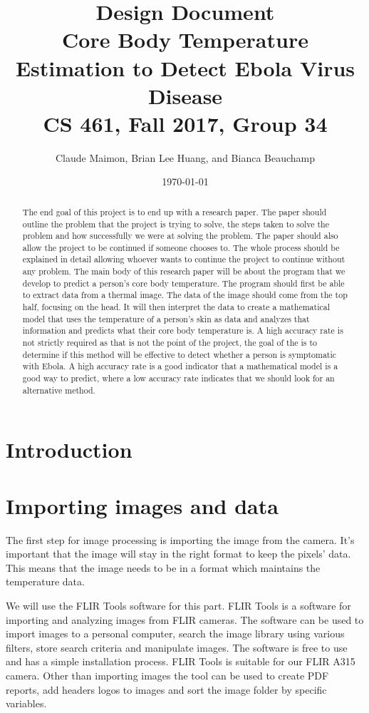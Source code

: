 \documentclass[onecolumn, draftclsnofoot,10pt, compsoc]{IEEEtran}
\title{%
  Design Document \\
  \vspace{0.4cm}
  \large Core Body Temperature Estimation to Detect Ebola Virus Disease \\
  \vspace{0.4cm}
  \large CS 461, Fall 2017, Group 34\\
    }
\author{Claude Maimon, Brian Lee Huang, and Bianca Beauchamp}
\date{\today}
\begin{document}
\maketitle

\begin{abstract}
	The end goal of this project is to end up with a research paper. The paper should outline the problem that the project is trying to solve, the steps taken to solve the problem and how successfully we were
	at solving the problem. The paper should also allow the project to be continued if someone chooses to. The whole process should be explained in detail allowing whoever wants to continue the
	project to continue without any problem. The main body of this research paper will be about the program that we develop to predict a person's core body temperature. The program should first be able to
	extract data from a thermal image. The data of the image should come from the top half, focusing on the head. It will then interpret the data to create a mathematical model that uses the temperature of a 
	person's skin as data and analyzes that information and predicts what their core body temperature is. A high accuracy rate is not strictly required as that is not the point of the project, 
	the goal of the is to determine if this method will be effective to detect whether a person is symptomatic with Ebola. A high accuracy rate is a good indicator that a mathematical model
	is a good way to predict, where a low accuracy rate indicates that we should look for an alternative method.
\end{abstract}

\newpage

\tableofcontents
\newpage
\section{Introduction}
\section{Importing images and data}
The first step for image processing is importing the image from the camera. It’s important that the image will stay in the right format to keep the pixels’ data.  This means that the image needs to be in a format which maintains the temperature data.  

We will use the FLIR Tools software for this part. FLIR Tools is a software for importing and analyzing images from FLIR cameras. The software can be used to import images to a personal computer, search the image library using various filters, store search criteria and manipulate images. The software is free to use and has a simple installation process. FLIR Tools is suitable for our FLIR A315 camera. Other than importing images the tool can be used to create PDF reports, add headers logos to images and sort the image folder by specific variables.\cite{ClaudeTech}
\end{document}
